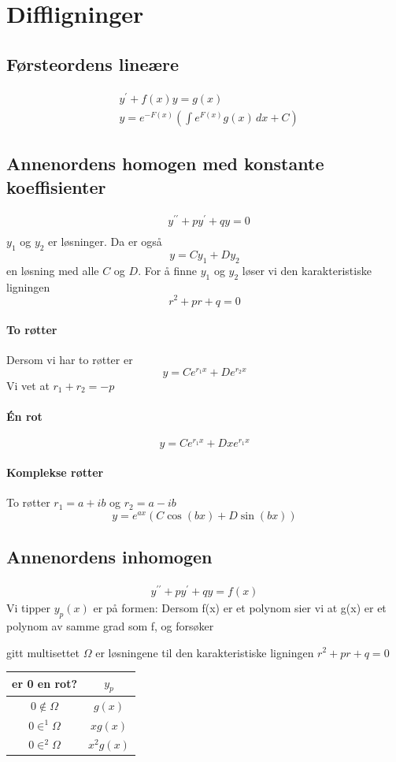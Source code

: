 \documentclass[defaultpackages]{cheatsheet}
\begin{document}
	\section{Diffligninger}
	\subsection{Førsteordens lineære}
	\begin{align*}
		&y^\prime + f(x)y = g(x)\\
		&y = e^{-F(x)}\left(\int e^{F(x)}g(x)\,dx + C\right)
	\end{align*}
\subsection{Annenordens homogen med konstante koeffisienter}
\begin{align*}
	&y^{\prime\prime}+py^\prime+qy=0\\
\end{align*}
	$y_1$ og $y_2$ er løsninger. Da er også
	$$y = Cy_1 + Dy_2$$
	en løsning med alle $C$ og $D$.
	For å finne $y_1$ og $y_2$ løser vi den karakteristiske ligningen
	\[r^2+pr + q = 0\]
	\paragraph{To røtter}
	Dersom vi har to røtter er
	\[y = Ce^{r_1x} + De^{r_2x}\]
	Vi vet at $r_1+r_2=-p$
	\paragraph{\'En rot}
	\[y=Ce^{r_1x}+Dxe^{r_1x}\]
	\paragraph{Komplekse røtter}
	To røtter $r_1=a+ib$ og $r_2 = a-ib$
	\[y=e^{ax}(C\cos(bx)+D\sin (bx))\]

\subsection{Annenordens inhomogen}
\begin{align*}
	y^{\prime\prime} + py^\prime + qy = f(x)
\end{align*}
Vi tipper $y_p(x)$ er på formen:
Dersom f(x) er et polynom sier vi at g(x) er et polynom av samme grad som f, og forsøker

gitt multisettet $\Omega$ er løsningene til den karakteristiske ligningen $r^2 + pr + q = 0$
\begin{tabular}{|c|c|}
	\hline
	er 0 en rot?& $y_p$\\\hline
	$0 \notin \Omega$ & $g(x)$\\
	$0 \in^1 \Omega$ & $xg(x)$\\
	$0 \in^2 \Omega$ & $x^2g(x)$\\
	\hline
\end{tabular}
\end{document}
